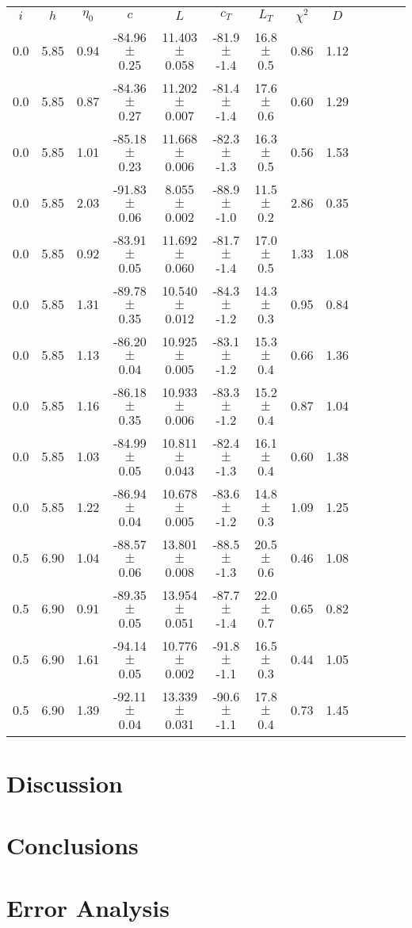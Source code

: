 \documentclass[10pt, twocolumn]{revtex4}    %
\begin{document}
\begin{table}[h]
  \begin{tabular}{|c|c|c|c|c|c|c|c|c|c|c|c|c|}
    \hline
    $i$ & $h$ & $\eta_{0}$ & $c$ & $L$ & $c_{T}$ & $L_{T}$  & $\chi^{2}$ & $D$ \\
    0.0 & 5.85 & 0.94 & -84.96 $\pm$ 0.25 & 11.403 $\pm$ 0.058 & -81.9 $\pm$ -1.4 & 16.8 $\pm$ 0.5 & 0.86 & 1.12 \\ \hline
0.0 & 5.85 & 0.87 & -84.36 $\pm$ 0.27 & 11.202 $\pm$ 0.007 & -81.4 $\pm$ -1.4 & 17.6 $\pm$ 0.6 & 0.60 & 1.29 \\ \hline
0.0 & 5.85 & 1.01 & -85.18 $\pm$ 0.23 & 11.668 $\pm$ 0.006 & -82.3 $\pm$ -1.3 & 16.3 $\pm$ 0.5 & 0.56 & 1.53 \\ \hline
0.0 & 5.85 & 2.03 & -91.83 $\pm$ 0.06 & 8.055 $\pm$ 0.002 & -88.9 $\pm$ -1.0 & 11.5 $\pm$ 0.2 & 2.86 & 0.35 \\ \hline
0.0 & 5.85 & 0.92 & -83.91 $\pm$ 0.05 & 11.692 $\pm$ 0.060 & -81.7 $\pm$ -1.4 & 17.0 $\pm$ 0.5 & 1.33 & 1.08 \\ \hline
0.0 & 5.85 & 1.31 & -89.78 $\pm$ 0.35 & 10.540 $\pm$ 0.012 & -84.3 $\pm$ -1.2 & 14.3 $\pm$ 0.3 & 0.95 & 0.84 \\ \hline
0.0 & 5.85 & 1.13 & -86.20 $\pm$ 0.04 & 10.925 $\pm$ 0.005 & -83.1 $\pm$ -1.2 & 15.3 $\pm$ 0.4 & 0.66 & 1.36 \\ \hline
0.0 & 5.85 & 1.16 & -86.18 $\pm$ 0.35 & 10.933 $\pm$ 0.006 & -83.3 $\pm$ -1.2 & 15.2 $\pm$ 0.4 & 0.87 & 1.04 \\ \hline
0.0 & 5.85 & 1.03 & -84.99 $\pm$ 0.05 & 10.811 $\pm$ 0.043 & -82.4 $\pm$ -1.3 & 16.1 $\pm$ 0.4 & 0.60 & 1.38 \\ \hline
0.0 & 5.85 & 1.22 & -86.94 $\pm$ 0.04 & 10.678 $\pm$ 0.005 & -83.6 $\pm$ -1.2 & 14.8 $\pm$ 0.3 & 1.09 & 1.25 \\ \hline
0.5 & 6.90 & 1.04 & -88.57 $\pm$ 0.06 & 13.801 $\pm$ 0.008 & -88.5 $\pm$ -1.3 & 20.5 $\pm$ 0.6 & 0.46 & 1.08 \\ \hline
0.5 & 6.90 & 0.91 & -89.35 $\pm$ 0.05 & 13.954 $\pm$ 0.051 & -87.7 $\pm$ -1.4 & 22.0 $\pm$ 0.7 & 0.65 & 0.82 \\ \hline
0.5 & 6.90 & 1.61 & -94.14 $\pm$ 0.05 & 10.776 $\pm$ 0.002 & -91.8 $\pm$ -1.1 & 16.5 $\pm$ 0.3 & 0.44 & 1.05 \\ \hline
0.5 & 6.90 & 1.39 & -92.11 $\pm$ 0.04 & 13.339 $\pm$ 0.031 & -90.6 $\pm$ -1.1 & 17.8 $\pm$ 0.4 & 0.73 & 1.45 \\ \hline 

  \end{tabular}
\end{table}
\section{Discussion}


\section{Conclusions}


\begin{thebibliography}{}


\end{thebibliography}

\clearpage
\appendix

\section{Error Analysis}
\end{document}
